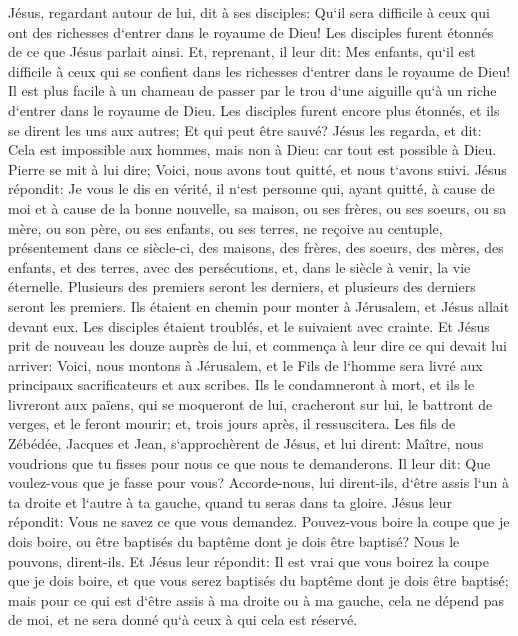 \verse Jésus, regardant autour de lui, dit à ses disciples: Qu`il sera difficile à ceux qui ont des richesses d`entrer dans le royaume de Dieu! 
\verse Les disciples furent étonnés de ce que Jésus parlait ainsi. Et, reprenant, il leur dit: Mes enfants, qu`il est difficile à ceux qui se confient dans les richesses d`entrer dans le royaume de Dieu! 
\verse Il est plus facile à un chameau de passer par le trou d`une aiguille qu`à un riche d`entrer dans le royaume de Dieu. 
\verse Les disciples furent encore plus étonnés, et ils se dirent les uns aux autres; Et qui peut être sauvé? 
\verse Jésus les regarda, et dit: Cela est impossible aux hommes, mais non à Dieu: car tout est possible à Dieu. 
\verse Pierre se mit à lui dire; Voici, nous avons tout quitté, et nous t`avons suivi. 
\verse Jésus répondit: Je vous le dis en vérité, il n`est personne qui, ayant quitté, à cause de moi et à cause de la bonne nouvelle, sa maison, ou ses frères, ou ses soeurs, ou sa mère, ou son père, ou ses enfants, ou ses terres, 
\verse ne reçoive au centuple, présentement dans ce siècle-ci, des maisons, des frères, des soeurs, des mères, des enfants, et des terres, avec des persécutions, et, dans le siècle à venir, la vie éternelle. 
\verse Plusieurs des premiers seront les derniers, et plusieurs des derniers seront les premiers. 
\verse Ils étaient en chemin pour monter à Jérusalem, et Jésus allait devant eux. Les disciples étaient troublés, et le suivaient avec crainte. Et Jésus prit de nouveau les douze auprès de lui, et commença à leur dire ce qui devait lui arriver: 
\verse Voici, nous montons à Jérusalem, et le Fils de l`homme sera livré aux principaux sacrificateurs et aux scribes. Ils le condamneront à mort, et ils le livreront aux païens, 
\verse qui se moqueront de lui, cracheront sur lui, le battront de verges, et le feront mourir; et, trois jours après, il ressuscitera. 
\verse Les fils de Zébédée, Jacques et Jean, s`approchèrent de Jésus, et lui dirent: Maître, nous voudrions que tu fisses pour nous ce que nous te demanderons. 
\verse Il leur dit: Que voulez-vous que je fasse pour vous? 
\verse Accorde-nous, lui dirent-ils, d`être assis l`un à ta droite et l`autre à ta gauche, quand tu seras dans ta gloire. 
\verse Jésus leur répondit: Vous ne savez ce que vous demandez. Pouvez-vous boire la coupe que je dois boire, ou être baptisés du baptême dont je dois être baptisé? Nous le pouvons, dirent-ils. 
\verse Et Jésus leur répondit: Il est vrai que vous boirez la coupe que je dois boire, et que vous serez baptisés du baptême dont je dois être baptisé; 
\verse mais pour ce qui est d`être assis à ma droite ou à ma gauche, cela ne dépend pas de moi, et ne sera donné qu`à ceux à qui cela est réservé. 
